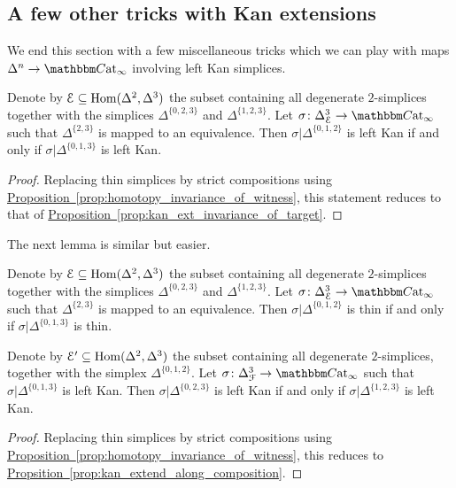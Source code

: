 \documentclass[main.tex]{subfiles}
\begin{document}
\subsection{A few other tricks with Kan extensions}
\label{ssc:a_few_other_tricks_with_kan_extensions}

We end this section with a few miscellaneous tricks which we can play with maps $\Delta^{n} \to \ICCat$ involving left Kan simplices.

\begin{lemma}
  \label{lemma:transport_left_kan_simplices}
  Denote by $\mathcal{E} \subseteq \mathrm{Hom}(\Delta^{2}, \Delta^{3})$ the subset containing all degenerate $2$-simplices together with the simplices $\Delta^{\{0,2,3\}}$ and $\Delta^{\{1,2,3\}}$. Let $\sigma\colon \Delta^{3}_{\mathcal{E}} \to \ICCat$ such that $\Delta^{\{2,3\}}$ is mapped to an equivalence. Then $\sigma|\Delta^{\{0,1,2\}}$ is left Kan if and only if $\sigma|\Delta^{\{0,1,3\}}$ is left Kan.
\end{lemma}
\begin{proof}
  Replacing thin simplices by strict compositions using \hyperref[prop:homotopy_invariance_of_witness]{Proposition~\ref*{prop:homotopy_invariance_of_witness}}, this statement reduces to that of \hyperref[prop:kan_ext_invariance_of_target]{Proposition~\ref*{prop:kan_ext_invariance_of_target}}.
\end{proof}

The next lemma is similar but easier.
\begin{lemma}
  \label{lemma:transport_thin_simplices}
  Denote by $\mathcal{E} \subseteq \mathrm{Hom}(\Delta^{2}, \Delta^{3})$ the subset containing all degenerate $2$-simplices together with the simplices $\Delta^{\{0,2,3\}}$ and $\Delta^{\{1,2,3\}}$. Let $\sigma\colon \Delta^{3}_{\mathcal{E}} \to \ICCat$ such that $\Delta^{\{2,3\}}$ is mapped to an equivalence. Then $\sigma|\Delta^{\{0,1,2\}}$ is thin if and only if $\sigma|\Delta^{\{0,1,3\}}$ is thin.
\end{lemma}

\begin{lemma}
  \label{lemma:compose_left_kan_simplices}
  Denote by $\mathcal{E}' \subseteq \mathrm{Hom}(\Delta^{2}, \Delta^{3})$ the subset containing all degenerate $2$-simplices, together with the simplex $\Delta^{\{0,1,2\}}$. Let $\sigma\colon \Delta^{3}_{\mathcal{F}} \to \ICCat$ such that $\sigma|\Delta^{\{0,1,3\}}$ is left Kan. Then $\sigma|\Delta^{\{0,2,3\}}$ is left Kan if and only if $\sigma|\Delta^{\{1,2,3\}}$ is left Kan.
\end{lemma}
\begin{proof}
  Replacing thin simplices by strict compositions using \hyperref[prop:homotopy_invariance_of_witness]{Proposition~\ref*{prop:homotopy_invariance_of_witness}}, this reduces to \hyperref[prop:kan_extend_along_composition]{Propsition~\ref*{prop:kan_extend_along_composition}}.
\end{proof}
\end{document}
